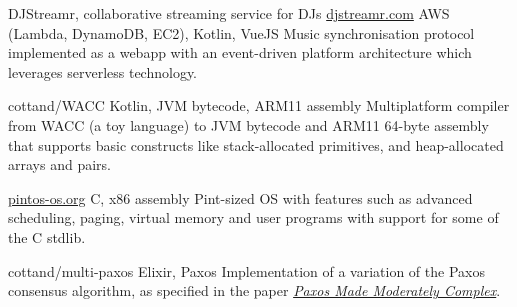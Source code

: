\begin{entrylist}
    \projEntry
    {DJStreamr, collaborative streaming service for DJs}
    {\href{https://djstreamr.com}{djstreamr.com}}
    {AWS (Lambda, DynamoDB, EC2), Kotlin, VueJS}
    {
        Music synchronisation protocol implemented as a webapp with an event-driven platform
        architecture which leverages serverless technology.
    }

    {cottand/WACC}
    {Kotlin, JVM bytecode, ARM11 assembly}
    {
        Multiplatform compiler from WACC (a toy language) to JVM bytecode and ARM11 64-byte assembly
    that supports basic constructs like stack-allocated primitives, and heap-allocated arrays
    and pairs.
    }

    {\href{https://pintos-os.org/}{pintos-os.org}}
    {C, x86 assembly}
    {
        Pint-sized OS with features such as advanced scheduling, paging, virtual memory and user
    programs with support for some of the C stdlib.
    }




    {cottand/multi-paxos}
    {Elixir, Paxos}
    {
        Implementation of a variation of the Paxos consensus algorithm, as specified in the paper
    \href{https://dl.acm.org/citation.cfm?id=2673577}{\textit{Paxos Made Moderately Complex}}.
    }
\end{entrylist}

